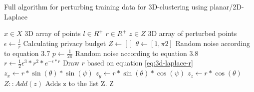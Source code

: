 \begin{algorithm}[H]
  \caption{Full algorithm for perturbing training data for 3D-clustering using planar/2D-Laplace \citep{DBLP:journals/corr/abs-1212-1984}}\label{alg:rq1}
  \begin{algorithmic}
    \Require $x \in X$  \Comment 3D array of points
    \Require $l \in R^ +$
    \Require $r \in R^ +$
    \Ensure $z \in Z$ \Comment 3D array of perturbed points
    \State $\epsilon \gets \frac{l}{r}$ \Comment Calculating privacy budget \citep{DBLP:journals/corr/abs-1212-1984}
    \State $Z \gets []$
    \State $\theta \gets [1, \pi2]$       \Comment Random noise according to equation 3.7
    \State $p \gets \frac{1}{2\pi}$     \Comment Random noise according to equation 3.8
    \State $r \gets \frac{1}{2}\epsilon^3 * r^2 * e^{-\epsilon * r}$          \Comment Draw $r$ based on equation \ref{eq:3d-laplace-r}
    \State $z_x \gets r * \sin(\theta) * \sin(\psi)$
    \State $z_y \gets r * \sin(\theta) * \cos(\psi)$
    \State $z_z \gets r * \cos(\theta)$
    \State $Z::Add(z)$                      \Comment Adds z to the list Z.
    \EndFor
    \State \Return Z
  \end{algorithmic}
  \label{alg:3d-laplace}
\end{algorithm}